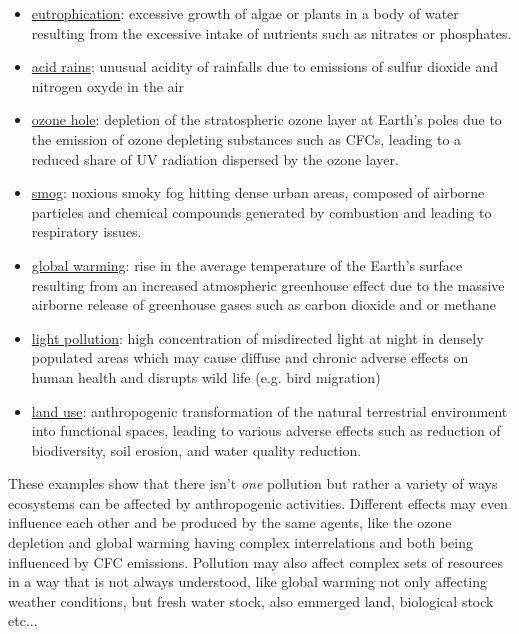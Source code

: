 \documentclass{article}
\begin{document}
\begin{itemize} %
	\item \href{https://en.wikipedia.org/wiki/Eutrophication}{eutrophication}: excessive growth of algae or plants in a body of water resulting from the excessive intake of nutrients such as nitrates or phosphates.
	\item \href{https://en.wikipedia.org/wiki/Acid_rain}{acid rains}: unusual acidity of rainfalls due to emissions of sulfur dioxide and nitrogen oxyde in the air
	\item \href{https://en.wikipedia.org/wiki/Ozone_depletion}{ozone hole}: depletion of the stratospheric ozone layer at Earth's poles due to the emission of ozone depleting substances such as CFCs, leading to a reduced share of UV radiation dispersed by the ozone layer. 
	\item \href{https://en.wikipedia.org/wiki/Smog}{smog}: noxious smoky fog hitting dense urban areas, composed of airborne particles and chemical compounds generated by combustion and leading to respiratory issues. 
	\item \href{https://en.wikipedia.org/wiki/Global_warming}{global warming}: rise in the average temperature of the Earth's surface resulting from an increased atmospheric greenhouse effect due to the massive airborne release of greenhouse gases such as carbon dioxide and or methane
	\item \href{https://en.wikipedia.org/wiki/Light_pollution}{light pollution}: high concentration of misdirected light at night in densely populated areas which may cause diffuse and chronic adverse effects on human health and disrupts wild life (e.g. bird migration) 
	\item \href{https://en.wikipedia.org/wiki/Land_use}{land use}: anthropogenic transformation of the natural terrestrial environment into functional spaces, leading to various adverse effects such as reduction of biodiversity, soil erosion, and water quality reduction. 
\end{itemize}
These examples show that there isn't \emph{one} pollution but rather a variety of ways ecosystems can be affected by anthropogenic activities. Different effects may even influence each other and be produced by the same agents, like the ozone depletion and global warming having complex interrelations and both being influenced by CFC emissions. Pollution may also affect complex sets of resources in a way that is not always understood, like global warming not only affecting weather conditions, but fresh water stock, also emmerged land, biological stock etc...
\end{document}

